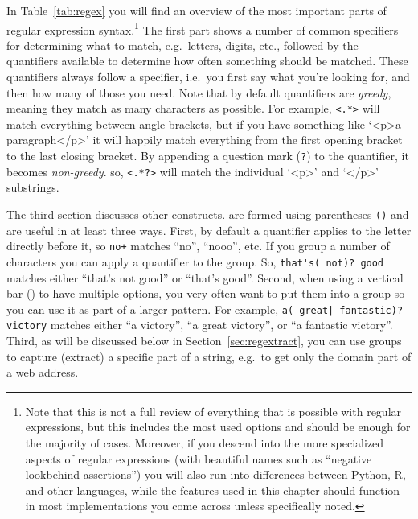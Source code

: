 In Table~\ref{tab:regex} you will find an overview of the most important parts of regular expression syntax.\footnote{
  Note that this is not a full review of everything that is possible with regular expressions, but this includes the most used options and should be enough for the majority of cases. Moreover, if you descend into the more specialized aspects of regular expressions (with beautiful names such as ``negative lookbehind assertions'') you will also run into differences between Python, R, and other languages, while the features used in this chapter should function in most implementations you come across unless specifically noted.
}
 The first part shows a number of common specifiers for determining what to match, e.g.\ letters, digits, etc.,
followed by the quantifiers available to determine how often something should be matched.
These quantifiers always follow a specifier, i.e.\ you first say what you're looking for, and then how many of those you need.
Note that by default quantifiers are \emph{greedy}, meaning they match as many characters as possible.
For example, \verb|<.*>| will match everything between angle brackets, but if you have something like `<p>a paragraph</p>'
it will happily match everything from the first opening bracket to the last closing bracket.
By appending a question mark (\verb|?|) to the quantifier, it becomes \emph{non-greedy}.
so, \verb|<.*?>| will match the individual `<p>' and `</p>' substrings.

The third section discusses other constructs.
 are formed using parentheses \verb|()| and are useful in at least three ways.
First, by default a quantifier applies to the letter directly before it, so \verb|no+| matches ``no'', ``nooo'', etc.
If you group a number of characters you can apply a quantifier to the group. So, \verb|that's( not)? good| matches either ``that's not good'' or 	``that's good''.
Second, when using a vertical bar (\textbar) to have multiple options, you very often want to put them into a group so you can use it as part of a larger pattern.
For example, \verb+a( great| fantastic)? victory+ matches either ``a victory'', ``a great victory'', or ``a fantastic victory''.
Third, as will be discussed below in Section~\ref{sec:regextract}, you can use groups to capture (extract) a specific part of a string, e.g.\ to get only the domain part of a web address.

